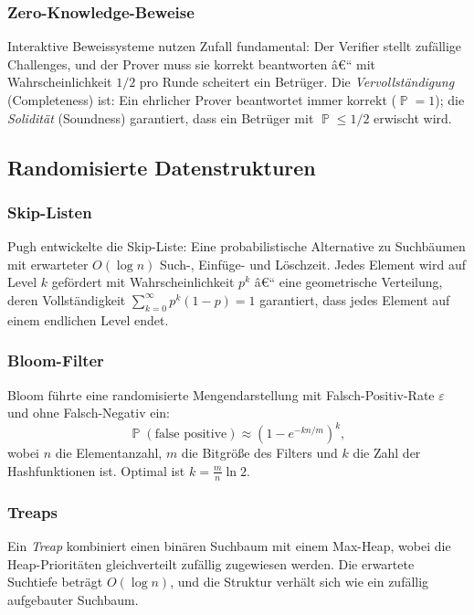 ﻿\documentclass[12pt,a4paper]{article}
\theoremstyle{definition}
\theoremstyle{plain}
\theoremstyle{remark}
\DeclareMathOperator{\Prob}{\mathbb{P}}
\begin{document}
\subsubsection{Zero-Knowledge-Beweise}
Interaktive Beweissysteme \cite{goldwasser1989knowledge} nutzen Zufall
fundamental: Der Verifier stellt zufällige Challenges, und der Prover muss
sie korrekt beantworten â€“ mit Wahrscheinlichkeit $1/2$ pro Runde scheitert
ein Betrüger. Die \emph{Vervollständigung} (Completeness) ist: Ein ehrlicher
Prover beantwortet immer korrekt ($\Prob = 1$); die \emph{Solidität}
(Soundness) garantiert, dass ein Betrüger mit $\Prob \leq 1/2$ erwischt wird.

\subsection{Randomisierte Datenstrukturen}

\subsubsection{Skip-Listen}
Pugh \cite{pugh1990skip} entwickelte die Skip-Liste: Eine probabilistische
Alternative zu Suchbäumen mit erwarteter $O(\log n)$ Such-, Einfüge- und
Löschzeit. Jedes Element wird auf Level $k$ gefördert mit Wahrscheinlichkeit
$p^k$ â€“ eine geometrische Verteilung, deren Vollständigkeit
$\sum_{k=0}^{\infty} p^k(1-p) = 1$ garantiert, dass jedes Element auf
einem endlichen Level endet.

\subsubsection{Bloom-Filter}
Bloom \cite{bloom1970space} führte eine randomisierte Mengendarstellung
mit Falsch-Positiv-Rate $\varepsilon$ und ohne Falsch-Negativ ein:
\[
  \Prob(\text{false positive}) \approx \left(1 - e^{-kn/m}\right)^k,
\]
wobei $n$ die Elementanzahl, $m$ die Bitgröße des Filters und $k$ die Zahl
der Hashfunktionen ist. Optimal ist $k = \frac{m}{n}\ln 2$.

\subsubsection{Treaps}
Ein \emph{Treap} \cite{seidel1996randomized} kombiniert einen binären
Suchbaum mit einem Max-Heap, wobei die Heap-Prioritäten gleichverteilt
zufällig zugewiesen werden. Die erwartete Suchtiefe beträgt $O(\log n)$,
und die Struktur verhält sich wie ein zufällig aufgebauter Suchbaum.
\end{document}
